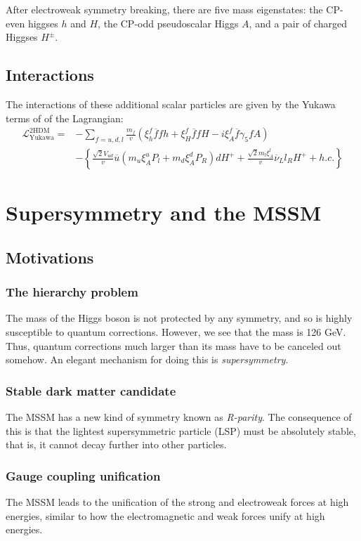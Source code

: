 After electroweak symmetry breaking, there are five mass eigenstates: the CP-even higgses $h$ and $H$, the CP-odd pseudoscalar Higgs $A$, and a pair of charged Higgses $H^\pm$.

\subsection{Interactions}

The interactions of these additional scalar particles are given by the Yukawa terms of of the Lagrangian:
\begin{align*}
\mathcal{L}^{\mathrm{2HDM}}_{\text{Yukawa}} =& - \sum_{f = u, d, l} \frac{m_f}{v}
\left(\xi_h^f \overline{f}fh+\xi_H^f \overline{f}fH-i\xi_A^f \overline{f}\gamma_5fA \right)\\
&-\left\{\frac{\sqrt{2}V_{ud}}{v}\overline{u}\left(m_u\xi_A^uP_l+m_d\xi_A^dP_R\right)dH^+ + \frac{\sqrt{2}m_l\xi^l_A}{v}\overline{\nu}_Ll_RH^+ + h.c.\right\}
\end{align*}
\section{Supersymmetry and the MSSM}
\subsection{Motivations}
\subsubsection{The hierarchy problem}
The mass of the Higgs boson is not protected by any symmetry, and so is highly susceptible to quantum corrections. However, we see that the mass is 126 GeV. Thus, quantum corrections much larger than its mass have to be canceled out somehow. An elegant mechanism for doing this is \emph{supersymmetry}.
\subsubsection{Stable dark matter candidate}
The MSSM has a new kind of symmetry known as \emph{R-parity}. The consequence of this is that the lightest supersymmetric particle (LSP) must be absolutely stable, that is, it cannot decay further into other particles.
\subsubsection{Gauge coupling unification}
The MSSM leads to the unification of the strong and electroweak forces at high energies, similar to how the electromagnetic and weak forces unify at high energies.
